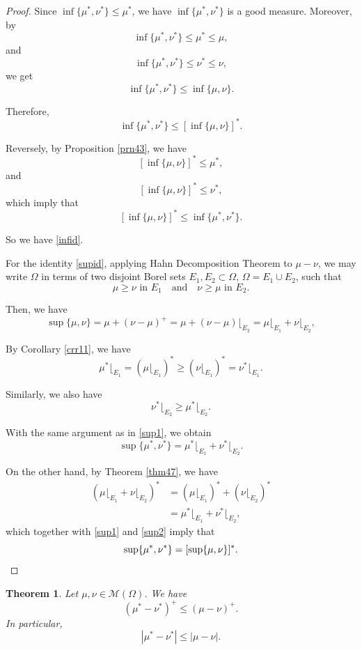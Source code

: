 \documentclass[a4paper, 11pt]{report}
\newtheorem{thm}{Theorem}[chapter]
\theoremstyle{definition}\newtheorem*{rmk}{Remark}
\begin{document}
\begin{proof}
\mbox{}

Since $\inf \{\mu^*,\nu^*\} \le \mu^*$, we have $\inf \{\mu^*,\nu^*\}$ is a good measure. Moreover, by
\[
\inf \{\mu^*,\nu^*\} \leq \mu^* \leq \mu,
\]
and
\[
\inf \{\mu^*,\nu^*\} \leq \nu^* \leq \nu,
\]
we get
\[
\inf \{\mu^*,\nu^*\} \leq \inf \{\mu,\nu\}.
\]

Therefore,
\[
\inf \{\mu^*,\nu^*\} \le [\inf \{\mu,\nu\}]^*.
\]

Reversely, by Proposition \ref{prn43}, we have
\[
[\inf\{\mu,\nu\}]^* \leq \mu^*,
\]
and
\[
[\inf\{\mu,\nu\}]^* \leq \nu^*,
\]
which imply that
\[
[\inf \{\mu,\nu\}]^* \le \inf \{\mu^*,\nu^*\} .
\]

So we have \eqref{infid}.

For the identity \eqref{supid}, applying Hahn Decomposition Theorem to $\mu - \nu$, we may write $\Omega$ in terms of two disjoint Borel sets $E_1,E_2\subset\Omega$, $\Omega = E_1 \cup E_2$, such that
\[
\mu \geq \nu \text{ in }E_1\quad\text{and}\quad \nu \geq \mu \text{ in }E_2.
\]

Then, we have
\begin{equation}\label{sup1}
\sup\{\mu,\nu\} = \mu + (\nu-\mu)^+ = \mu + (\nu-\mu)\lfloor_{E_2} = \mu\lfloor_{E_1} + \nu\lfloor_{E_2},
\end{equation}

By Corollary \ref{crr11}, we have
\[
\mu^*\lfloor_{E_1} = (\mu\lfloor_{E_1})^* \geq (\nu\lfloor_{E_1})^* = \nu^*\lfloor_{E_1}.
\]

Similarly, we also have
\[
\nu^*\lfloor_{E_2} \geq \mu^*\lfloor_{E_2} .
\]

With the same argument as in \eqref{sup1}, we obtain
\begin{equation}\label{sup2}
\sup\{\mu^*,\nu^*\} = \mu^*\lfloor_{E_1} + \nu^*\lfloor_{E_2}.
\end{equation}

On the other hand, by Theorem \ref{thm47}, we have
\begin{align*}
(\mu\lfloor_{E_1} + \nu\lfloor_{E_2})^*& = (\mu\lfloor_{E_1})^* + (\nu\lfloor_{E_2})^* \\
&= \mu^*\lfloor_{E_1} + \nu^*\lfloor_{E_2},
\end{align*}
which together with \eqref{sup1} and \eqref{sup2} imply that
\[
\sup\{\mu^*,\nu^*\} = [\sup\{\mu,\nu\}]^*.\qedhere
\]
\end{proof}

\begin{thm}
Let $\mu, \nu \in\mathcal{M}(\Omega)$. We have
\[
(\mu^* - \nu^*)^+ \le (\mu -\nu)^+.
\]
In particular,
\[
|\mu^* - \nu^*| \le |\mu - \nu|.
\]
\end{thm}
\end{document}
